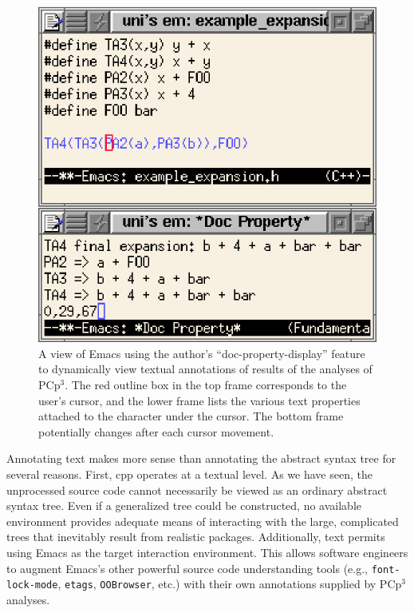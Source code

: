 \documentclass{article}
\newcommand{\pcp}{\mbox{\textsf{PCp}$^3$}}
\newcommand{\Cpp}{\mbox{\textsf{cpp}}}
\newcommand{\eg}{e.g.,}
\newcommand{\etc}{etc}  %
\begin{document}
\begin{figure}[htbp]
  \begin{center}
    \leavevmode
    \includegraphics{figs/doc-prop.ps}
    \caption{A view of Emacs using the author's ``doc-property-display''
      feature to dynamically view textual annotations of results of the
      analyses of \pcp{}.  The red outline box in the top frame
      corresponds to the user's cursor, and the lower frame lists the
      various text properties attached to the character under the
      cursor.  The bottom frame potentially changes after each cursor movement.}
    \label{fig:emacsdocprop}
  \end{center}
\end{figure}


Annotating text makes more sense than annotating the abstract syntax
tree for several reasons.  First, \Cpp{} operates at a textual level.
As we have seen, the unprocessed source code cannot necessarily be
viewed as an ordinary abstract syntax tree.  Even if a generalized tree
could be constructed, no available environment provides adequate means
of interacting with the large, complicated trees that inevitably result
from realistic packages.
Additionally, text permits using Emacs as the target interaction
environment. This allows software engineers to augment Emacs's other
powerful source code understanding tools (\eg{} \texttt{font-lock-mode},
\texttt{etags}, \texttt{OOBrowser}, \etc{}.)  with their own annotations
supplied by \pcp{} analyses.
\end{document}
